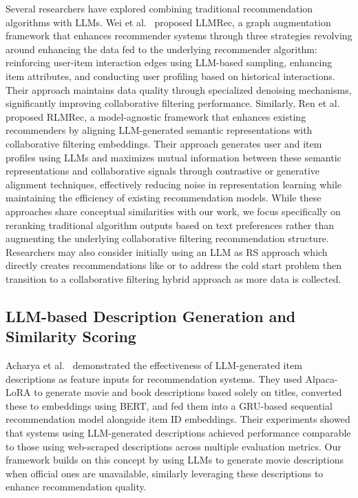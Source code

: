 \documentclass[sigconf]{acmart}
\begin{document}
Several researchers have explored combining traditional recommendation algorithms with LLMs. Wei et al.~\cite{wei2024llmrec} proposed LLMRec, a graph augmentation framework that enhances recommender systems through three strategies revolving around enhancing the data fed to the underlying recommender algorithm: reinforcing user-item interaction edges using LLM-based sampling, enhancing item attributes, and conducting user profiling based on historical interactions. Their approach maintains data quality through specialized denoising mechanisms, significantly improving collaborative filtering performance. Similarly, Ren et al.~\cite{ren2024representation} proposed RLMRec, a model-agnostic framework that enhances existing recommenders by aligning LLM-generated semantic representations with collaborative filtering embeddings. Their approach generates user and item profiles using LLMs and maximizes mutual information between these semantic representations and collaborative signals through contrastive or generative alignment techniques, effectively reducing noise in representation learning while maintaining the efficiency of existing recommendation models. While these approaches share conceptual similarities with our work, we focus specifically on reranking traditional algorithm outputs based on text preferences rather than augmenting the underlying collaborative filtering recommendation structure. Researchers may also consider initially using an LLM as RS approach which directly creates recommendations like \cite{sanner2023large} or \cite{zhang2024llmtreerec} to address the cold start problem then transition to a collaborative filtering hybrid approach as more data is collected.

\subsection{LLM-based Description Generation and Similarity Scoring}

Acharya et al.~\cite{AcharyaLLM2023} demonstrated the effectiveness of LLM-generated item descriptions as feature inputs for recommendation systems. They used Alpaca-LoRA to generate movie and book descriptions based solely on titles, converted these to embeddings using BERT, and fed them into a GRU-based sequential recommendation model alongside item ID embeddings. Their experiments showed that systems using LLM-generated descriptions achieved performance comparable to those using web-scraped descriptions across multiple evaluation metrics. Our framework builds on this concept by using LLMs to generate movie descriptions when official ones are unavailable, similarly leveraging these descriptions to enhance recommendation quality. 
\end{document}
